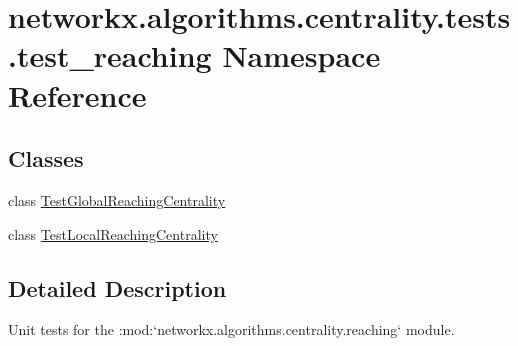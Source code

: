 \hypertarget{namespacenetworkx_1_1algorithms_1_1centrality_1_1tests_1_1test__reaching}{}\section{networkx.\+algorithms.\+centrality.\+tests.\+test\+\_\+reaching Namespace Reference}
\label{namespacenetworkx_1_1algorithms_1_1centrality_1_1tests_1_1test__reaching}
\subsection*{Classes}
\begin{DoxyCompactItemize}
\item 
class \hyperlink{classnetworkx_1_1algorithms_1_1centrality_1_1tests_1_1test__reaching_1_1TestGlobalReachingCentrality}{Test\+Global\+Reaching\+Centrality}
\item 
class \hyperlink{classnetworkx_1_1algorithms_1_1centrality_1_1tests_1_1test__reaching_1_1TestLocalReachingCentrality}{Test\+Local\+Reaching\+Centrality}
\end{DoxyCompactItemize}


\subsection{Detailed Description}
\begin{DoxyVerb}Unit tests for the :mod:`networkx.algorithms.centrality.reaching` module.\end{DoxyVerb}
 